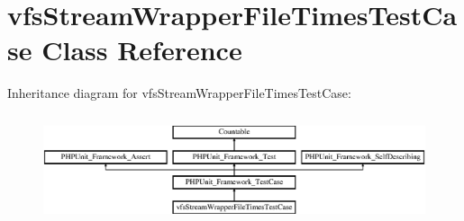 \hypertarget{classorg_1_1bovigo_1_1vfs_1_1vfs_stream_wrapper_file_times_test_case}{}\section{vfs\+Stream\+Wrapper\+File\+Times\+Test\+Case Class Reference}
\label{classorg_1_1bovigo_1_1vfs_1_1vfs_stream_wrapper_file_times_test_case}
Inheritance diagram for vfs\+Stream\+Wrapper\+File\+Times\+Test\+Case\+:\begin{figure}[H]
\begin{center}
\leavevmode
\includegraphics[height=3.246377cm]{classorg_1_1bovigo_1_1vfs_1_1vfs_stream_wrapper_file_times_test_case}
\end{center}
\end{figure}
